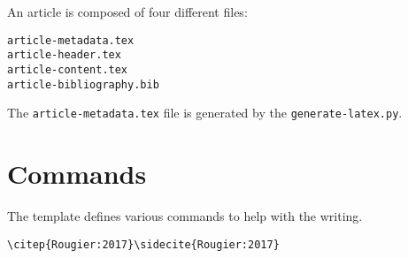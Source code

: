 An article is composed of four different files:
\begin{lstlisting}
article-metadata.tex
article-header.tex
article-content.tex
article-bibliography.bib
\end{lstlisting}


The {\tt article-metadata.tex} file is generated by the {\tt generate-latex.py}.\\

\begin{minipage}{\fullwidth}
  \em \lipsum[1]
\end{minipage}





\section{Commands}

The template defines various commands to help with the writing.
\begin{lstlisting}
\citep{Rougier:2017}\sidecite{Rougier:2017}
\end{lstlisting}

\lipsum[1]


\lipsum[2]
